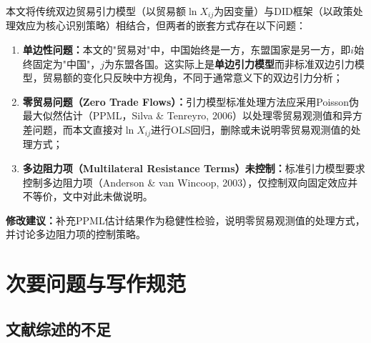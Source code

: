 \documentclass[12pt, a4paper]{article}
\begin{document}
\begin{majorbox}

本文将传统双边贸易引力模型（以贸易额$\ln X_{ij}$为因变量）与DID框架（以政策处理效应为核心识别策略）相结合，但两者的嵌套方式存在以下问题：

\begin{enumerate}[label=\arabic*)]
  \item \textbf{单边性问题：}本文的"贸易对"中，中国始终是一方，东盟国家是另一方，即$i$始终固定为"中国"，$j$为东盟各国。这实际上是\textbf{单边引力模型}而非标准双边引力模型，贸易额的变化只反映中方视角，不同于通常意义下的双边引力分析；

  \item \textbf{零贸易问题（Zero Trade Flows）：}引力模型标准处理方法应采用Poisson伪最大似然估计（PPML，Silva \& Tenreyro, 2006）以处理零贸易观测值和异方差问题，而本文直接对$\ln X_{ij}$进行OLS回归，删除或未说明零贸易观测值的处理方式；

  \item \textbf{多边阻力项（Multilateral Resistance Terms）未控制：}标准引力模型要求控制多边阻力项（Anderson \& van Wincoop, 2003），仅控制双向固定效应并不等价，文中对此未做说明。
\end{enumerate}

\textbf{修改建议：}补充PPML估计结果作为稳健性检验，说明零贸易观测值的处理方式，并讨论多边阻力项的控制策略。
\end{majorbox}

\section{次要问题与写作规范}

\subsection{文献综述的不足}
\label{sec:literature}
\end{document}
